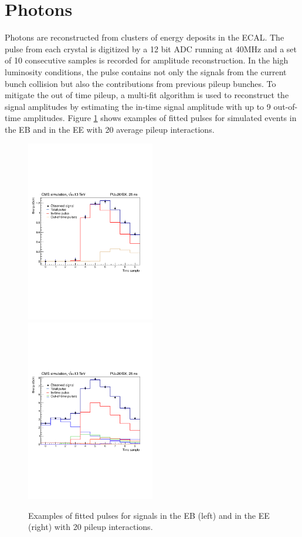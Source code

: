 \documentclass[thesis.tex]{subfiles}
\begin{document}
\section{Photons}
\label{sec:reco-photon}

Photons are reconstructed from clusters of energy deposits in the ECAL.
The pulse from each crystal is digitized by a 12 bit ADC running at 40MHz and a set of 10 consecutive samples is recorded for amplitude reconstruction.
In the high luminosity conditions, the pulse contains not only the signals from the current bunch collision but also the contributions from previous pileup bunches.
To mitigate the out of time pileup, a multi-fit algorithm is used to reconstruct the signal amplitudes by estimating the in-time signal amplitude with up to 9 out-of-time amplitudes.
Figure \ref{fig:multifit} shows examples of fitted pulses for simulated events in the EB and in the EE with 20 average pileup interactions.

\begin{figure}[hbtp]
	\includegraphics[width=0.5\textwidth]{plot/multifit_EB.pdf}
	\includegraphics[width=0.5\textwidth]{plot/multifit_EE.pdf}
	\caption{Examples of fitted pulses for signals in the EB (left) and in the EE (right) with 20 pileup interactions.}
	\label{fig:multifit}
\end{figure}
\end{document}
